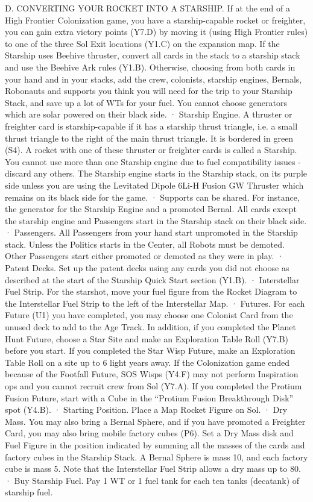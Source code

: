 \documentclass[a4paper]{book}
\begin{document}
D. CONVERTING YOUR ROCKET INTO A STARSHIP. If at the end of a High Frontier Colonization game, you have a starship-capable rocket or freighter, you can gain extra victory points (Y7.D) by moving it (using High Frontier rules) to one of the three Sol Exit locations (Y1.C) on the expansion map. If the Starship uses Beehive thruster, convert all cards in the stack to a starship stack and use the Beehive Ark rules (Y1.B). Otherwise, choosing from both cards in your hand and in your stacks, add the crew, colonists, starship engines, Bernals, Robonauts and supports you think you will need for the trip to your Starship Stack, and save up a lot of WTs for your fuel. You cannot choose generators which are solar powered on their black side.
·       Starship Engine. A thruster or freighter card is starship-capable if it has a starship thrust triangle, i.e. a small thrust triangle to the right of the main thrust triangle. It is bordered in green (S4). A rocket with one of these thruster or freighter cards is called a Starship. You cannot use more than one Starship engine due to fuel compatibility issues - discard any others. The Starship engine starts in the Starship stack, on its purple side unless you are using the Levitated Dipole 6Li-H Fusion GW Thruster which remains on its black side for the game.
·       Supports can be shared. For instance, the generator for the Starship Engine and a promoted Bernal. All cards except the starship engine and Passengers start in the Starship stack on their black side.
·       Passengers. All Passengers from your hand start unpromoted in the Starship stack. Unless the Politics starts in the Center, all Robots must be demoted. Other Passengers start either promoted or demoted as they were in play.
·       Patent Decks. Set up the patent decks using any cards you did not choose as described at the start of the Starship Quick Start section (Y1.B).
·       Interstellar Fuel Strip. For the starshot, move your fuel figure from the Rocket Diagram to the Interstellar Fuel Strip to the left of the Interstellar Map.
·       Futures. For each Future (U1) you have completed, you may choose one Colonist Card from the unused deck to add to the Age Track. In addition, if you completed the Planet Hunt Future, choose a Star Site and make an Exploration Table Roll (Y7.B) before you start. If you completed the Star Wisp Future, make an Exploration Table Roll on a site up to 6 light years away. If the Colonization game ended because of the Footfall Future, SOS Wisps (Y4.F) may not perform Inspiration ops and you cannot recruit crew from Sol (Y7.A). If you completed the Protium Fusion Future, start with a Cube in the “Protium Fusion Breakthrough Disk” spot (Y4.B).
·       Starting Position. Place a Map Rocket Figure on Sol.
·       Dry Mass. You may also bring a Bernal Sphere, and if you have promoted a Freighter Card, you may also bring mobile factory cubes (P6). Set a Dry Mass disk and Fuel Figure in the position indicated by summing all the masses of the cards and factory cubes in the Starship Stack. A Bernal Sphere is mass 10, and each factory cube is mass 5. Note that the Interstellar Fuel Strip allows a dry mass up to 80.
·       Buy Starship Fuel. Pay 1 WT or 1 fuel tank for each ten tanks (decatank) of starship fuel.
 
\end{document}
